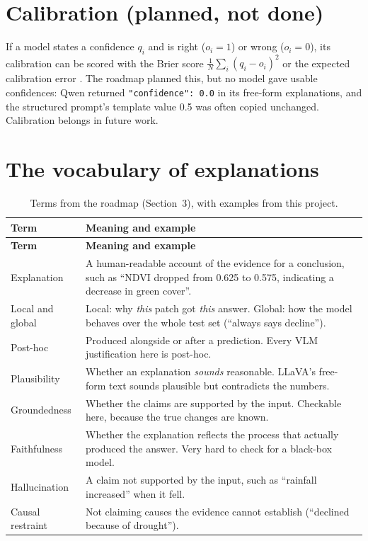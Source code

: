 \section{Calibration (planned, not done)}

If a model states a confidence $q_i$ and is right ($o_i = 1$) or wrong ($o_i = 0$), its calibration can be scored with the Brier score $\frac{1}{N}\sum_i (q_i - o_i)^2$ or the expected calibration error \citep{brier1950,guo2017}. The roadmap planned this, but no model gave usable confidences: Qwen returned \texttt{"confidence": 0.0} in its free-form explanations, and the structured prompt's template value 0.5 was often copied unchanged. Calibration belongs in future work.

\section{The vocabulary of explanations}

\begin{longtable}{L{3.3cm}L{11.0cm}}
\caption{Terms from the roadmap (Section~3), with examples from this project.}\label{tab:xaiterms}\\
\toprule
\textbf{Term} & \textbf{Meaning and example} \\
\midrule
\endfirsthead
\toprule
\textbf{Term} & \textbf{Meaning and example} \\
\midrule
\endhead
Explanation & A human-readable account of the evidence for a conclusion, such as ``NDVI dropped from 0.625 to 0.575, indicating a decrease in green cover''. \\
Local and global & Local: why \emph{this} patch got \emph{this} answer. Global: how the model behaves over the whole test set (``always says decline''). \\
Post-hoc & Produced alongside or after a prediction. Every VLM justification here is post-hoc. \\
Plausibility & Whether an explanation \emph{sounds} reasonable. LLaVA's free-form text sounds plausible but contradicts the numbers. \\
Groundedness & Whether the claims are supported by the input. Checkable here, because the true changes are known. \\
Faithfulness & Whether the explanation reflects the process that actually produced the answer. Very hard to check for a black-box model. \\
Hallucination & A claim not supported by the input, such as ``rainfall increased'' when it fell. \\
Causal restraint & Not claiming causes the evidence cannot establish (``declined because of drought''). \\
\bottomrule
\end{longtable}

